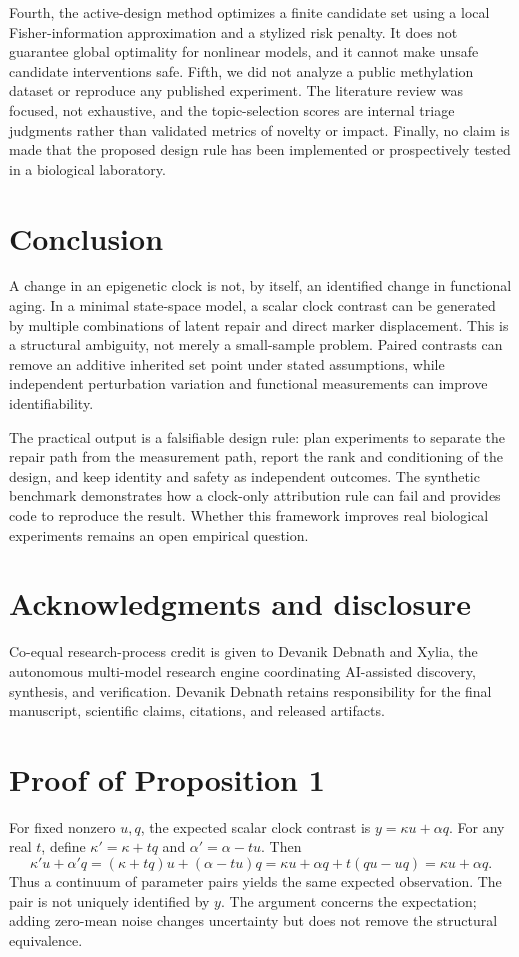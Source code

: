 \documentclass[10pt,a4paper]{article}
\begin{document}
Fourth, the active-design method optimizes a finite candidate set using a local Fisher-information approximation and a stylized risk penalty. It does not guarantee global optimality for nonlinear models, and it cannot make unsafe candidate interventions safe. Fifth, we did not analyze a public methylation dataset or reproduce any published experiment. The literature review was focused, not exhaustive, and the topic-selection scores are internal triage judgments rather than validated metrics of novelty or impact. Finally, no claim is made that the proposed design rule has been implemented or prospectively tested in a biological laboratory.

\section{Conclusion}
A change in an epigenetic clock is not, by itself, an identified change in functional aging. In a minimal state-space model, a scalar clock contrast can be generated by multiple combinations of latent repair and direct marker displacement. This is a structural ambiguity, not merely a small-sample problem. Paired contrasts can remove an additive inherited set point under stated assumptions, while independent perturbation variation and functional measurements can improve identifiability.

The practical output is a falsifiable design rule: plan experiments to separate the repair path from the measurement path, report the rank and conditioning of the design, and keep identity and safety as independent outcomes. The synthetic benchmark demonstrates how a clock-only attribution rule can fail and provides code to reproduce the result. Whether this framework improves real biological experiments remains an open empirical question.

\section*{Acknowledgments and disclosure}
Co-equal research-process credit is given to Devanik Debnath and Xylia, the autonomous multi-model research engine coordinating AI-assisted discovery, synthesis, and verification. Devanik Debnath retains responsibility for the final manuscript, scientific claims, citations, and released artifacts.

\clearpage



\appendix
\section{Proof of Proposition 1}
For fixed nonzero \(u,q\), the expected scalar clock contrast is \(y=\kappa u+\alpha q\). For any real \(t\), define \(\kappa'=\kappa+tq\) and \(\alpha'=\alpha-tu\). Then
\[
\kappa' u+\alpha' q
=(\kappa+tq)u+(\alpha-tu)q
=\kappa u+\alpha q+t(qu-uq)
=\kappa u+\alpha q.
\]
Thus a continuum of parameter pairs yields the same expected observation. The pair is not uniquely identified by \(y\). The argument concerns the expectation; adding zero-mean noise changes uncertainty but does not remove the structural equivalence.
\end{document}
